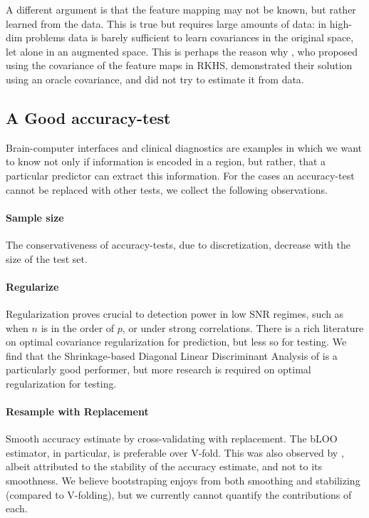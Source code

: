 \documentclass[]{bio}
\begin{document}
A different argument is that the feature mapping may not be known, but rather learned from the data. 
This is true but requires large amounts of data: in high-dim problems data is barely sufficient to learn covariances in the original space, let alone in an augmented space.  
This is perhaps the reason why \cite{harchaoui2009kernel}, who proposed using the covariance of the feature maps in RKHS, demonstrated their solution using an oracle covariance, and did not try to estimate it from data. 





\subsection{A Good accuracy-test}
Brain-computer interfaces and clinical diagnostics \citep{olivetti_induction_2012,wager_fmri-based_2013} are examples in which we want to know not only if information is encoded in a region, but rather, that a particular predictor can extract this information. 
For the cases an accuracy-test cannot be replaced with other tests, we collect the following observations.

\paragraph{Sample size} The conservativeness of accuracy-tests, due to discretization, decrease with the size of the test set. 

\paragraph{Regularize}
Regularization proves crucial to detection power in low SNR regimes, such as when $n$ is in the order of $p$, or under strong correlations.
There is a rich literature on optimal covariance regularization for prediction, but less so for testing.
We find that the Shrinkage-based Diagonal Linear Discriminant Analysis of \cite{pang_shrinkage-based_2009} is a particularly good performer, but more research is required on optimal regularization for testing. 


\paragraph{Resample with Replacement}
Smooth accuracy estimate by cross-validating with replacement. 
The bLOO estimator, in particular, is preferable over V-fold.
This was also observed by \cite{yu2007two}, albeit attributed to the stability of the accuracy estimate, and not to its smoothness. 
We believe bootstraping enjoys from both smoothing and stabilizing (compared to V-folding), but we currently cannot quantify the contributions of each. 
\end{document}

